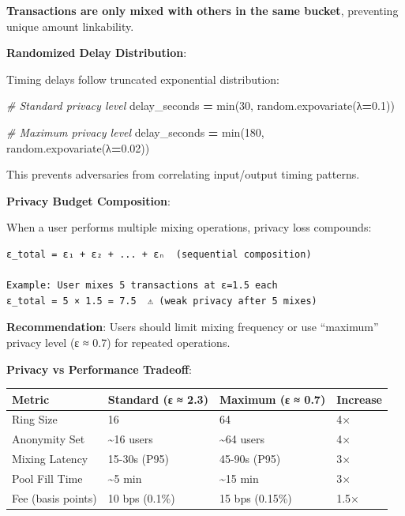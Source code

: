 \documentclass[
  11pt,
]{article}
\newenvironment{Shaded}{\begin{snugshade}}{\end{snugshade}}
\newcommand{\BuiltInTok}[1]{#1}
\newcommand{\CommentTok}[1]{\textcolor[rgb]{0.56,0.35,0.01}{\textit{#1}}}
\newcommand{\DecValTok}[1]{\textcolor[rgb]{0.00,0.00,0.81}{#1}}
\newcommand{\FloatTok}[1]{\textcolor[rgb]{0.00,0.00,0.81}{#1}}
\newcommand{\NormalTok}[1]{#1}
\newcommand{\OperatorTok}[1]{\textcolor[rgb]{0.81,0.36,0.00}{\textbf{#1}}}
\begin{document}
\textbf{Transactions are only mixed with others in the same bucket},
preventing unique amount linkability.

\textbf{Randomized Delay Distribution}:

Timing delays follow truncated exponential distribution:

\begin{Shaded}
\begin{Highlighting}[]
\CommentTok{\# Standard privacy level}
\NormalTok{delay\_seconds }\OperatorTok{=} \BuiltInTok{min}\NormalTok{(}\DecValTok{30}\NormalTok{, random.expovariate(λ}\OperatorTok{=}\FloatTok{0.1}\NormalTok{))}

\CommentTok{\# Maximum privacy level}
\NormalTok{delay\_seconds }\OperatorTok{=} \BuiltInTok{min}\NormalTok{(}\DecValTok{180}\NormalTok{, random.expovariate(λ}\OperatorTok{=}\FloatTok{0.02}\NormalTok{))}
\end{Highlighting}
\end{Shaded}

This prevents adversaries from correlating input/output timing patterns.

\textbf{Privacy Budget Composition}:

When a user performs multiple mixing operations, privacy loss compounds:

\begin{verbatim}
ε_total = ε₁ + ε₂ + ... + εₙ  (sequential composition)

Example: User mixes 5 transactions at ε=1.5 each
ε_total = 5 × 1.5 = 7.5  ⚠️ (weak privacy after 5 mixes)
\end{verbatim}

\textbf{Recommendation}: Users should limit mixing frequency or use
``maximum'' privacy level (ε ≈ 0.7) for repeated operations.

\textbf{Privacy vs Performance Tradeoff}:

\begin{longtable}[]{@{}llll@{}}
\toprule
Metric & Standard (ε ≈ 2.3) & Maximum (ε ≈ 0.7) & Increase \\
\midrule
\endhead
Ring Size & 16 & 64 & 4× \\
Anonymity Set & \textasciitilde16 users & \textasciitilde64 users &
4× \\
Mixing Latency & 15-30s (P95) & 45-90s (P95) & 3× \\
Pool Fill Time & \textasciitilde5 min & \textasciitilde15 min & 3× \\
Fee (basis points) & 10 bps (0.1\%) & 15 bps (0.15\%) & 1.5× \\
\bottomrule
\end{longtable}
\end{document}
